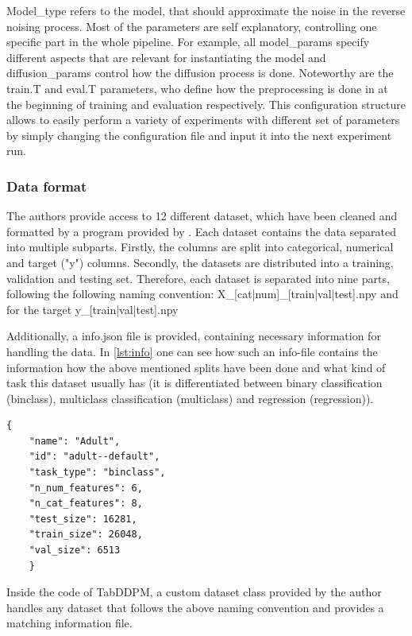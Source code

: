 Model\_type refers to the model, that should approximate the noise in the reverse noising process.
Most of the parameters are self explanatory, controlling one specific part in the whole pipeline.
For example, all model\_params specify different aspects that are relevant for instantiating the model and diffusion\_params control how the diffusion process is done.
Noteworthy are the train.T and eval.T parameters, who define how the preprocessing is done in at the beginning of training and evaluation respectively.
This configuration structure allows to easily perform a variety of experiments with different set of parameters by simply changing the configuration file and input it into the next experiment run.

\subsubsection[]{Data format}
\label{sec:data_format}
The authors provide access to 12 different dataset, which have been cleaned and formatted by a program provided by \cite[]{gorishniy2023EmbeddingsNumericalFeatures}.
Each dataset contains the data separated into multiple subparts.
Firstly, the columns are split into categorical, numerical and target ("y") columns.
Secondly, the datasets are distributed into a training, validation and testing set.
Therefore, each dataset is separated into nine parts, following the following naming convention:
X\_[cat|num]\_[train|val|test].npy and for the target y\_[train|val|test].npy

Additionally, a info.json file is provided, containing necessary information for handling the data.
In \autoref{lst:info} one can see how such an info-file contains the information how the above mentioned splits have been done and what kind of task this dataset usually has (it is differentiated between binary classification (binclass), multiclass classification (multiclass) and regression (regression)).
\begin{lstlisting}[label={lst:info},caption={Example data info file}]
    {
    "name": "Adult",
    "id": "adult--default",
    "task_type": "binclass",
    "n_num_features": 6,
    "n_cat_features": 8,
    "test_size": 16281,
    "train_size": 26048,
    "val_size": 6513
    }
\end{lstlisting}
Inside the code of TabDDPM, a custom dataset class provided by the author handles any dataset that follows the above naming convention and provides a matching information file.




